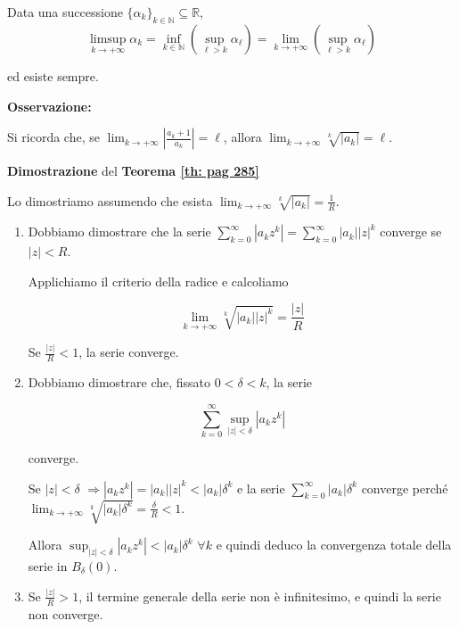\begin{definition}
	Data una successione $\{\alpha_k\}_{k\in\mathbb{N}}\subseteq \mathbb{R}$, 
	\begin{equation*}
		\limsup_{k\rightarrow+\infty} \alpha_k=\inf_{k\in\mathbb{N}}\left(\sup_{\ell>k} \alpha_\ell\right)=\lim_{k \rightarrow+\infty}\left(\sup_{\ell>k}\alpha_\ell\right)
	\end{equation*}
	
	ed esiste sempre.
	
\end{definition}


\textbf{Osservazione:}

Si ricorda che, se $\lim_{k\rightarrow+\infty}|\frac{a_k+1}{a_k}|=\ell$, allora $\lim_{k\rightarrow+\infty}\sqrt[k]{|a_k|}=\ell$.


\begin{dembar}
	\textbf{Dimostrazione} del \textbf{Teorema \ref{th: pag 285}}
	
	Lo dimostriamo assumendo che esista $\lim_{k\rightarrow+\infty}\sqrt[k]{|a_k|}=\frac{1}{R}$.
	\begin{enumerate}
		\item Dobbiamo dimostrare che la serie $\sum_{k=0}^{\infty}|a_kz^k|=\sum_{k=0}^{\infty}|a_k||z|^k$ converge se $|z|<R$.
		
		Applichiamo il criterio della radice e calcoliamo 
		
		$$\lim_{k \rightarrow+\infty}\sqrt[k]{|a_k||z|^k}=\frac{|z|}{R}$$
		
		Se $\frac{|z|}{R}<1$, la serie converge.
		
		\item Dobbiamo dimostrare che, fissato $0<\delta<k$, la serie 
		
		$$\sum_{k=0}^{\infty}\sup_{|z|<\delta} |a_kz^k|$$ 
		
		converge.
		
		Se $|z|<\delta$ $\Rightarrow |a_kz^k|=|a_k||z|^k<|a_k|\delta^k$ e la serie $\sum_{k=0}^{\infty}|a_k|\delta^k$ converge perché\\%
		$\lim_{k \rightarrow+\infty} \sqrt[k]{|a_k|\delta^k}=\frac{\delta}{R}<1$. 
		
		Allora $\sup_{|z|<\delta}|a_kz^k|<|a_k|\delta^k\,\, \forall k$ e quindi deduco la convergenza totale della serie in $B_{\delta}(0)$.
		
		\item Se $\frac{|z|}{R}>1$, il termine generale della serie non è infinitesimo, e quindi la serie non converge.
	\end{enumerate}
\end{dembar}


